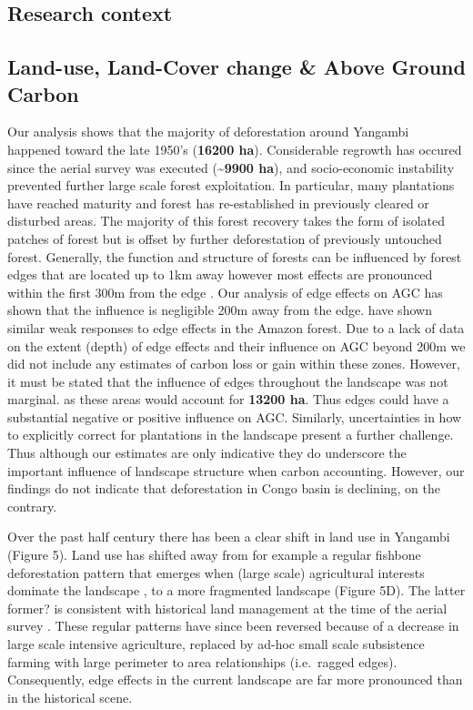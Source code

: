 \documentclass[remote sensing,article,submit,moreauthors,pdftex]{mdpi}
\begin{document}
\hypertarget{research-context}{%
\subsection{Research context}\label{research-context}}

\hypertarget{land-use-land-cover-change-above-ground-carbon}{%
\subsection{Land-use, Land-Cover change \& Above Ground
Carbon}\label{land-use-land-cover-change-above-ground-carbon}}

Our analysis shows that the majority of deforestation around Yangambi
happened toward the late 1950's (\textbf{16200 ha}). Considerable
regrowth has occured since the aerial survey was executed
(\textbf{\textasciitilde{}9900 ha}), and socio-economic instability
prevented further large scale forest exploitation. In particular, many
plantations have reached maturity and forest has re-established in
previously cleared or disturbed areas. The majority of this forest
recovery takes the form of isolated patches of forest but is offset by
further deforestation of previously untouched forest. Generally, the
function and structure of forests can be influenced by forest edges that
are located up to 1km away however most effects are pronounced within
the first 300m from the edge \citep{gascon2000}. Our analysis of edge
effects on AGC has shown that the influence is negligible 200m away from
the edge. \citet{phillips2006} have shown similar weak responses to edge
effects in the Amazon forest. Due to a lack of data on the extent
(depth) of edge effects and their influence on AGC beyond 200m we did
not include any estimates of carbon loss or gain within these zones.
However, it must be stated that the influence of edges throughout the
landscape was not marginal. as these areas would account for
\textbf{13200 ha}. Thus edges could have a substantial negative
\citep{brinck2017} or positive \citep{reinmann2017} influence on AGC.
Similarly, uncertainties in how to explicitly correct for plantations in
the landscape present a further challenge. Thus although our estimates
are only indicative they do underscore the important influence of
landscape structure when carbon accounting. However, our findings do not
indicate that deforestation in Congo basin is declining, on the
contrary.

Over the past half century there has been a clear shift in land use in
Yangambi (Figure 5). Land use has shifted away from for example a
regular fishbone deforestation pattern that emerges when (large scale)
agricultural interests dominate the landscape \citep{arima2015}, to a
more fragmented landscape (Figure 5D). The latter former? is consistent
with historical land management at the time of the aerial survey
\citep{bustillo2018}. These regular patterns have since been reversed
because of a decrease in large scale intensive agriculture, replaced by
ad-hoc small scale subsistence farming with large perimeter to area
relationships (i.e.~ragged edges). Consequently, edge effects in the
current landscape are far more pronounced than in the historical scene.
\end{document}
